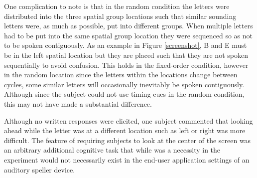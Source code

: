 \documentclass[10pt]{article}
\begin{document}
One complication to note is that in the random condition the
letters were distributed into the three spatial group
locations such that similar sounding letters were, as much as
possible, put into different groups. When multiple letters had
to be put into the same spatial group location they were
sequenced so as not to be spoken contiguously.  As an example
in Figure \ref{screenshot}, B and E must be in the left
spatial location but they are placed such that they are not
spoken sequentially to avoid confusion.  This holds in the
fixed-order condition, however in the random location since
the letters within the locations change between cycles, some
similar letters will occasionally inevitably be spoken contiguously.
Although since the subject could not use timing cues in the
random condition, this may not have made a substantial
difference. 


Although no written responses were elicited, one subject commented that looking ahead while the letter was at a
different location such as left or right was more difficult.  The
feature of requiring subjects to look at the center of the screen
was an arbitrary additional cognitive task that while
was a necessity in the experiment would not necessarily exist in the
end-user application settings of an auditory speller device.


\end{document}
